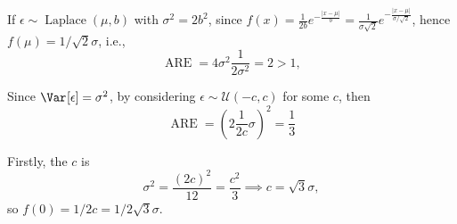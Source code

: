 \begin{eg}[Laplace]
	If \(\epsilon \sim \operatorname{Laplace}(\mu , b) \) with \(\sigma ^2 = 2 b^2\), since \(f(x) = \frac{1}{2b} e^{- \frac{\vert x - \mu \vert }{b}} = \frac{1}{\sigma \sqrt{2} } e^{- \frac{\vert x - \mu \vert }{\sigma / \sqrt{2}}}\), hence \(f(\mu ) = 1 /\sqrt{2} \sigma \), i.e.,
	\[
		\operatorname{ARE}
		= 4 \sigma ^2 \frac{1}{2 \sigma ^2}
		= 2 > 1,
	\]
\end{eg}

\begin{eg}[Uniform]
	Since \(\Var_{}[\epsilon ] = \sigma ^2\), by considering \(\epsilon \sim \mathcal{U} (-c, c)\) for some \(c\), then
	\[
		\operatorname{ARE}
		= \left( 2 \frac{1}{2c} \sigma \right)  ^2
		= \frac{1}{3}
	\]
\end{eg}
\begin{explanation}
	Firstly, the \(c\) is
	\[
		\sigma ^2
		= \frac{(2c)^2}{12}
		= \frac{c^2}{3}
		\implies c = \sqrt{3} \sigma ,
	\]
	so \(f(0) = 1 / 2c = 1 / 2 \sqrt{3} \sigma \).
\end{explanation}

